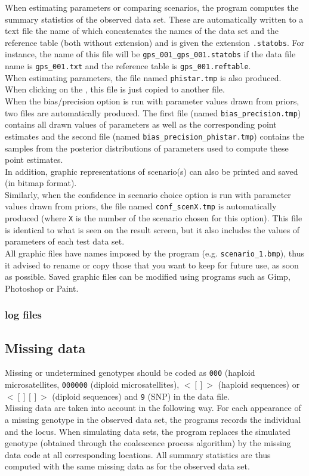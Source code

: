 When estimating parameters or comparing scenarios, the program computes the summary statistics of the observed data set. These are automatically written to a text file the name of which concatenates the names of the data set and the reference table (both without extension) and is given the extension \texttt{.statobs}. For instance, the name of this file will be \texttt{gps\_001\_gps\_001.statobs} if the data file name is \texttt{gps\_001.txt} and the reference table is \texttt{gps\_001.reftable}.\\
 When estimating parameters, the file named \texttt{phistar.tmp} is also produced. When clicking on the , this file is just copied to another file.\\
 When the bias/precision option is run with parameter values drawn from priors, two files  are automatically produced. The first file (named \texttt{bias\_precision.tmp}) contains all drawn values of parameters as well as the corresponding point estimates and the second file (named \texttt{bias\_precision\_phistar.tmp}) contains the samples from the posterior distributions of parameters used to compute these point estimates.\\
In addition, graphic representations of scenario(s) can also be printed and saved (in bitmap format).\\
Similarly, when the confidence in scenario choice option is run with parameter values drawn from priors, the file named \texttt{conf\_scenX.tmp} is automatically produced (where \texttt{X} is the number of the scenario chosen for this option). This file is identical to what is seen on the result screen, but it also includes the values of parameters of each test data set.\\
All graphic files have names imposed by the program (e.g.  \texttt{scenario\_1.bmp}),  thus it advised to rename or copy those that you want to keep for future use, as soon as possible. Saved graphic files can be modified using programs such as Gimp, Photoshop or Paint. 
\subsubsection{log files}


\subsection{Missing data}
Missing or undetermined genotypes should be coded as \texttt{000} (haploid microsatellites, \texttt{000000}  (diploid microsatellites), \texttt{$<[]>$} (haploid sequences) or \texttt{$<[][]>$} (diploid sequences) and \texttt{9} (SNP) in the data file. \\
Missing data are taken into account in the following way. For each appearance of a missing genotype in the observed data set, the programs records the individual and the locus. When simulating data sets, the program replaces the simulated genotype (obtained through the coalescence process algorithm) by the missing data code at all corresponding locations. All summary statistics are thus computed with the same missing data as for the observed data set. 

